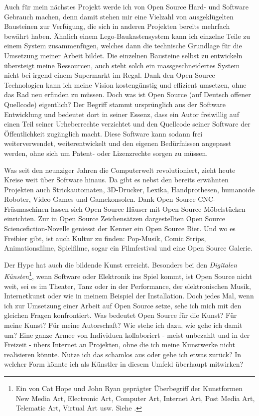 \documentclass[
paper=164mm:234mm, %
pagesize, %
DIV=calc, %
10pt, %
BCOR=0mm, %
parskip=half- %
]{scrbook}
\begin{document}
Auch für mein nächstes Projekt werde ich von Open Source Hard- und Software Gebrauch machen, denn damit stehen mir eine Vielzahl von ausgeklügelten Bausteinen zur Verfügung, die sich in anderen Projekten bereits mehrfach bewährt haben. Ähnlich einem Lego-Baukastensystem kann ich einzelne Teile zu einem System zusammenfügen, welches dann die technische Grundlage für die Umsetzung meiner Arbeit bildet. Die einzelnen Bausteine selbst zu entwickeln übersteigt meine Ressourcen, auch steht solch ein massgeschneidertes System nicht bei irgend einem Supermarkt im Regal. Dank den Open Source Technologien kann ich meine Vision kostengünstig und effizient umsetzen, ohne das Rad neu erfinden zu müssen. Doch was ist Open Source (auf Deutsch offener Quellcode) eigentlich? Der Begriff stammt ursprünglich aus der Software Entwicklung und bedeutet dort in seiner Essenz, dass ein Autor freiwillig auf einen Teil seiner Urheberrechte verzichtet und den Quellcode seiner Software der Öffentlichkeit zugänglich macht. Diese Software kann sodann frei weiterverwendet, weiterentwickelt und den eigenen Bedürfnissen angepasst werden, ohne sich um Patent- oder Lizenzrechte sorgen zu müssen.

Was seit den neunziger Jahren die Computerwelt revolutioniert, zieht heute Kreise weit über Software hinaus. Da gibt es nebst den bereits erwähnten Projekten auch Strickautomaten, 3D-Drucker, Lexika, Handprothesen, humanoide Roboter, Video Games und Gamekonsolen. Dank Open Source CNC-Fräsmaschinen lassen sich Open Source Häuser mit Open Source Möbelstücken einrichten. Zur in Open Source Zeichensätzen dargestellten Open Source Sciencefiction-Novelle geniesst der Kenner ein Open Source Bier. Und wo es Freibier gibt, ist auch Kultur zu finden: Pop-Musik, Comic Strips, Animationsfilme, Spielfilme, sogar ein Filmfestival und eine Open Source Galerie.

Der Hype hat auch die bildende Kunst erreicht. Besonders bei den \emph{Digitalen Künsten}\footnote{Ein von Cat Hope und John Ryan geprägter Überbegriff der Kunstformen  New Media Art, Electronic Art, Computer Art, Internet Art, Post Media Art, Telematic Art, Virtual Art usw. Siehe \cite[3-12]{Hope-Ryan:2014}.}, wenn Software oder Elektronik ins Spiel kommt, ist Open Source nicht weit, sei es im Theater, Tanz oder in der Performance, der elektronischen Musik, Internetkunst oder wie in meinem Beispiel der Installation. Doch jedes Mal, wenn ich zur Umsetzung einer Arbeit auf Open Source setze, sehe ich mich mit den gleichen Fragen konfrontiert. Was bedeutet Open Source für die Kunst? Für meine Kunst? Für meine Autorschaft? Wie stehe ich dazu, wie gehe ich damit um?
Eine ganze Armee von Individuen kollaboriert - meist unbezahlt und in der Freizeit - übers Internet an Projekten, ohne die ich meine Kunstwerke nicht realisieren könnte. Nutze ich das schamlos aus oder gebe ich etwas zurück? In welcher Form könnte ich als Künstler in diesem Umfeld überhaupt mitwirken?
\end{document}
